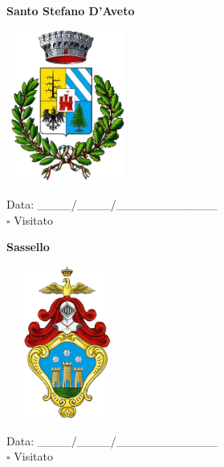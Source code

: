 \documentclass[a5paper,12pt]{article}
\begin{document}
\vspace{0.7cm}

\noindent
\begin{minipage}[t]{0.45\textwidth}
    \begin{center}
        \textbf{Santo Stefano D'Aveto}
    \end{center}
    \vspace{-0.5cm} %
    \begin{center}
        \includegraphics[height= 5cm, width=4cm]{Liguria/Stemma Santo Stefano d'Aveto.png}
    \end{center}
    \vspace{-0.4cm} %
    \begin{flushleft}
        Data: \_\_\_\_/\_\_\_\_/\_\_\_\_\_\_\_\_\_\_\_\_ \\
        $\square$ Visitato
    \end{flushleft}
\end{minipage}
\hfill
\noindent
\begin{minipage}[t]{0.45\textwidth}
    \begin{center}
        \textbf{Sassello}
    \end{center}
    \vspace{-0.5cm} %
    \begin{center}
        \includegraphics[height= 5cm, width=4cm]{Liguria/Stemma Sassello.png}
    \end{center}
    \vspace{-0.4cm} %
    \begin{flushleft}
        Data: \_\_\_\_/\_\_\_\_/\_\_\_\_\_\_\_\_\_\_\_\_ \\
        $\square$ Visitato
    \end{flushleft}
\end{minipage}
\end{document}

